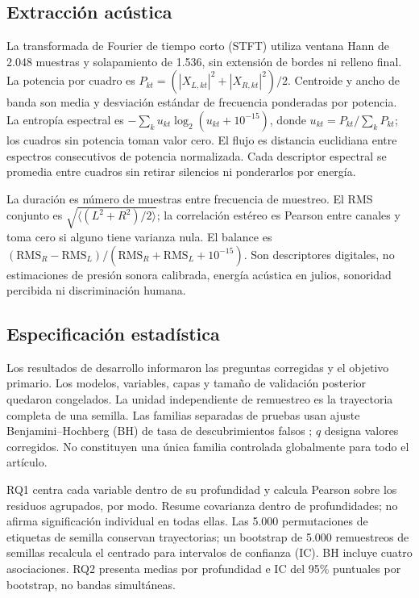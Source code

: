 \documentclass[pdflatex,iicol,sn-basic,Numbered]{sn-jnl}
\begin{document}
\subsection{Extracción acústica}
La transformada de Fourier de tiempo corto (STFT) utiliza ventana Hann de 2.048 muestras y solapamiento de 1.536, sin extensión de bordes ni relleno final. La potencia por cuadro es $P_{kt}=(|X_{L,kt}|^2+|X_{R,kt}|^2)/2$. Centroide y ancho de banda son media y desviación estándar de frecuencia ponderadas por potencia. La entropía espectral es $-\sum_k u_{kt}\log_2(u_{kt}+10^{-15})$, donde $u_{kt}=P_{kt}/\sum_kP_{kt}$; los cuadros sin potencia toman valor cero. El flujo es distancia euclidiana entre espectros consecutivos de potencia normalizada. Cada descriptor espectral se promedia entre cuadros sin retirar silencios ni ponderarlos por energía.

La duración es número de muestras entre frecuencia de muestreo. El RMS conjunto es $\sqrt{\langle(L^2+R^2)/2\rangle}$; la correlación estéreo es Pearson entre canales y toma cero si alguno tiene varianza nula. El balance es $(\mathrm{RMS}_R-\mathrm{RMS}_L)/(\mathrm{RMS}_R+\mathrm{RMS}_L+10^{-15})$. Son descriptores digitales, no estimaciones de presión sonora calibrada, energía acústica en julios, sonoridad percibida ni discriminación humana.

\subsection{Especificación estadística}
Los resultados de desarrollo informaron las preguntas corregidas y el objetivo primario. Los modelos, variables, capas y tamaño de validación posterior quedaron congelados. La unidad independiente de remuestreo es la trayectoria completa de una semilla. Las familias separadas de pruebas usan ajuste Benjamini--Hochberg (BH) de tasa de descubrimientos falsos \citep{Benjamini1995}; $q$ designa valores corregidos. No constituyen una única familia controlada globalmente para todo el artículo.

RQ1 centra cada variable dentro de su profundidad y calcula Pearson sobre los residuos agrupados, por modo. Resume covarianza dentro de profundidades; no afirma significación individual en todas ellas. Las 5.000 permutaciones de etiquetas de semilla conservan trayectorias; un bootstrap de 5.000 remuestreos de semillas recalcula el centrado para intervalos de confianza (IC). BH incluye cuatro asociaciones. RQ2 presenta medias por profundidad e IC del 95\% puntuales por bootstrap, no bandas simultáneas.
\end{document}
